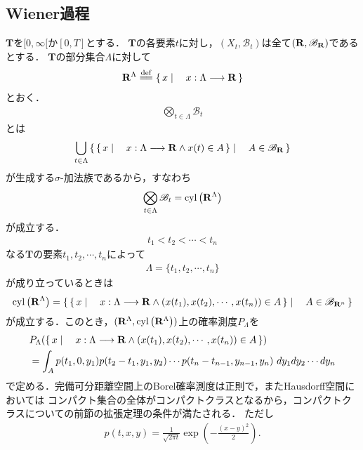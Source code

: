 \subsection{Wiener過程}
\label{sec:Wiener_process}
	$\mathbf{T}$を$[0,\infty[$か$[0,T]$とする．
	$\mathbf{T}$の各要素$t$に対し，$(X_t,\mathscr{B}_t)$は全て$(\mathbf{R},\mathscr{B}_{\mathbf{R}})$であるとする．
	$\mathbf{T}$の部分集合$\Lambda$に対して
	\begin{align}
		\R^\Lambda \defeq \Set{x}{x:\Lambda \longrightarrow \R}
	\end{align}
	とおく．
	\begin{align}
		\bigotimes_{t \in \Lambda} \mathscr{B}_t
	\end{align}
	とは
	\begin{align}
		\bigcup_{t \in \Lambda} \left\{\, \left\{\, x \mid \quad x:\Lambda \longrightarrow \mathbf{R} \wedge x(t) \in A\, \right\} \mid \quad A \in \mathscr{B}_{\mathbf{R}}\, \right\}
	\end{align}
	が生成する$\sigma$-加法族であるから，すなわち
	\begin{align}
		\bigotimes_{t \in \Lambda} \mathscr{B}_t = \operatorname{cyl}\left(\mathbf{R}^\Lambda\right)
	\end{align}
	が成立する．
	\begin{align}
		t_1 < t_2 < \cdots < t_n
	\end{align}
	なる$\mathbf{T}$の要素$t_1,t_2,\cdots,t_n$によって
	\begin{align}
		\Lambda = \{t_1,t_2,\cdots,t_n\}
	\end{align}
	が成り立っているときは
	\begin{align}
		\operatorname{cyl}\left(\mathbf{R}^\Lambda\right)
		= \left\{\, \left\{\, x \mid \quad x:\Lambda \longrightarrow \mathbf{R} \wedge (x(t_1),x(t_2),\cdots,x(t_n)) \in A\, \right\} \mid \quad A \in \mathscr{B}_{\mathbf{R}^n}\, \right\}
	\end{align}
	が成立する．このとき，$(\mathbf{R}^\Lambda,\operatorname{cyl}\left(\mathbf{R}^\Lambda\right))$上の確率測度$P_\Lambda$を
	\begin{align}
		&P_\Lambda(\left\{\, x \mid \quad x:\Lambda \longrightarrow \mathbf{R} \wedge (x(t_1),x(t_2),\cdots,x(t_n)) \in A\, \right\}) \\
		&= \int_A p(t_1,0,y_1)p(t_2-t_1,y_1,y_2) \cdots p(t_n-t_{n-1},y_{n-1},y_n)\ dy_1 dy_2\cdots dy_n
	\end{align}
	で定める．完備可分距離空間上のBorel確率測度は正則で，またHausdorff空間においては
	コンパクト集合の全体がコンパクトクラスとなるから，コンパクトクラスについての前節の拡張定理の条件が満たされる．
	ただし
	\begin{align}
		p(t,x,y) = \frac{1}{\sqrt{2 \pi t}} \exp{\left(-\frac{(x-y)^2}{2}\right)}.
	\end{align}
	
